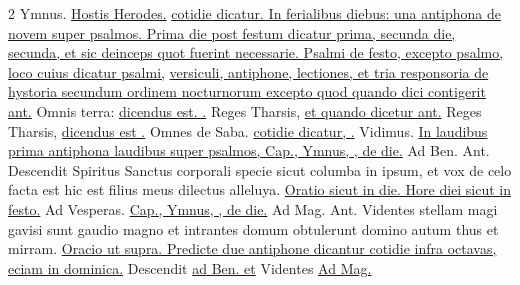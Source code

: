 \begin{multicols*}{2}
{\color{Red} Ymnus.} \hyperlink{hostis-herodes}{Hostis Herodes.} \ul{cotidie dicatur. In ferialibus diebus: una antiphona de novem super psalmos. Prima die post festum dicatur prima, secunda die, secunda, et sic deinceps quot fuerint necessarie. Psalmi de festo, excepto psalmo,}  \ul{loco cuius dicatur psalmi,}  \ul{versiculi, antiphone, lectiones, et tria responsoria de hystoria secundum ordinem nocturnorum excepto quod quando dici contigerit ant.} Omnis terra: \ul{dicendus est. \Vbar .} Reges Tharsis, \ul{et quando dicetur ant.} Reges Tharsis, \ul{dicendus est \Vbar .} Omnes de Saba.  \ul{cotidie dicatur, \Vbar .} Vidimus. \ul{In laudibus prima antiphona laudibus super psalmos, Cap., Ymnus, \Vbar , de die.} {\color{Red} Ad Ben. Ant.} Descendit Spiritus Sanctus corporali specie sicut columba in ipsum, et vox de celo facta est hic est filius meus dilectus alleluya. \ul{Oratio sicut in die. Hore diei sicut in festo.} {\color{Red} Ad Vesperas.} \ul{Cap., Ymnus, \Vbar , de die.} {\color{Red} Ad Mag. Ant.} Videntes stellam magi gavisi sunt gaudio magno et intrantes domum obtulerunt domino autum thus et mirram. \ul{Oracio ut supra. Predicte due antiphone dicantur cotidie infra octavas, eciam in dominica.} Descendit \ul{ad Ben. et} Videntes \ul{Ad Mag.}

\end{multicols*}
